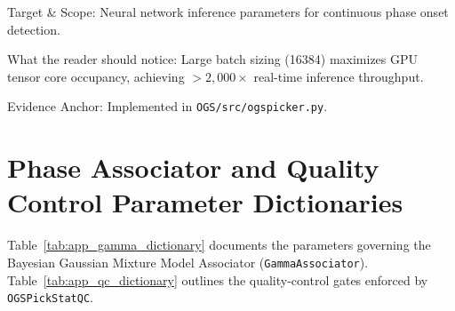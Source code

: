 \begin{table}[htbp]
\begin{threeparttable}
\begin{tabularx}{\linewidth}{l l l c X}
      \bottomrule
    \end{tabularx}
    \begin{tablenotes}[flushleft]
      \footnotesize
      \item Target \& Scope: Neural network inference parameters for continuous phase onset detection.
      \item What the reader should notice: Large batch sizing (\num{16384}) maximizes GPU tensor core occupancy, achieving $>2{,}000\times$ real-time inference throughput.
      \item Evidence Anchor: Implemented in \texttt{OGS/src/ogspicker.py}.
    \end{tablenotes}
  \end{threeparttable}
\end{table}

\section{Phase Associator and Quality Control Parameter Dictionaries}
\label{sec:app_assoc_qc_params}

Table~\ref{tab:app_gamma_dictionary} documents the parameters governing the Bayesian Gaussian Mixture Model Associator (\texttt{GammaAssociator}). Table~\ref{tab:app_qc_dictionary} outlines the quality-control gates enforced by \texttt{OGSPickStatQC}.


